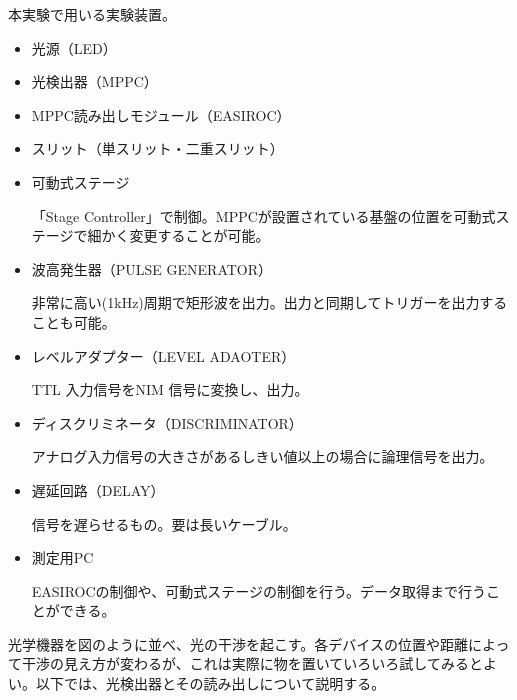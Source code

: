\documentclass[uplatex,10pt,a4j]{jsarticle}
\begin{document}
本実験で用いる実験装置。
\begin{itemize}
  \item 光源（LED）
  \item 光検出器（MPPC）
  \item MPPC読み出しモジュール（EASIROC）
  \item スリット（単スリット・二重スリット）
  \item 可動式ステージ\par
        「Stage Controller」で制御。MPPCが設置されている基盤の位置を可動式ステージで細かく変更することが可能。
  \item 波高発生器（PULSE GENERATOR）\par
        非常に高い(1kHz)周期で矩形波を出力。出力と同期してトリガーを出力することも可能。
  \item レベルアダプター（LEVEL ADAOTER）\par
        TTL 入力信号をNIM 信号に変換し、出力。
  \item ディスクリミネータ（DISCRIMINATOR）\par
        アナログ入力信号の大きさがあるしきい値以上の場合に論理信号を出力。
  \item 遅延回路（DELAY）\par
        信号を遅らせるもの。要は長いケーブル。
  \item 測定用PC \par
        EASIROCの制御や、可動式ステージの制御を行う。データ取得まで行うことができる。
\end{itemize}
光学機器を図のように並べ、光の干渉を起こす。各デバイスの位置や距離によって干渉の見え方が変わるが、これは実際に物を置いていろいろ試してみるとよい。以下では、光検出器とその読み出しについて説明する。
\end{document}

